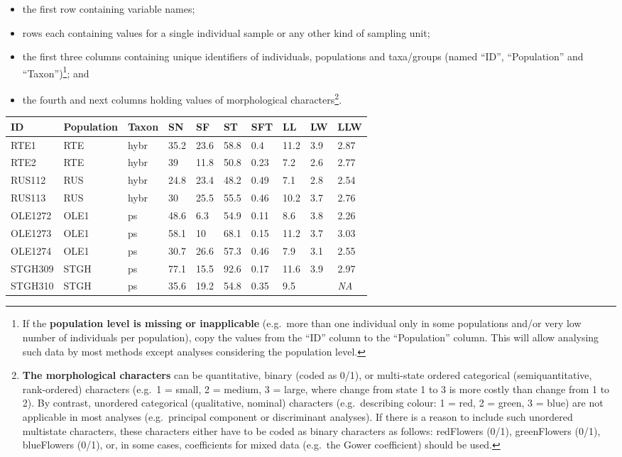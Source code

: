 \documentclass[
]{article}
\providecommand{\tightlist}{%
  \setlength{\itemsep}{0pt}\setlength{\parskip}{0pt}}
\begin{document}
\begin{itemize}
\tightlist
\item
  the first row containing variable names;
\item
  rows each containing values for a single individual sample or any
  other kind of sampling unit;
\item
  the first three columns containing unique identifiers of individuals,
  populations and taxa/groups (named ``ID'', ``Population'' and
  ``Taxon'')\footnote{If the \textbf{population level is missing or
    inapplicable} (e.g.~more than one individual only in some
    populations and/or very low number of individuals per population),
    copy the values from the ``ID'' column to the ``Population'' column.
    This will allow analysing such data by most methods except analyses
    considering the population level.}; and
\item
  the fourth and next columns holding values of morphological
  characters\footnote{\textbf{The morphological characters} can be
    quantitative, binary (coded as 0/1), or multi-state ordered
    categorical (semiquantitative, rank-ordered) characters (e.g.~1 =
    small, 2 = medium, 3 = large, where change from state 1 to 3 is more
    costly than change from 1 to 2). By contrast, unordered categorical
    (qualitative, nominal) characters (e.g.~describing colour: 1 = red,
    2 = green, 3 = blue) are not applicable in most analyses
    (e.g.~principal component or discriminant analyses). If there is a
    reason to include such unordered multistate characters, these
    characters either have to be coded as binary characters as follows:
    redFlowers (0/1), greenFlowers (0/1), blueFlowers (0/1), or, in some
    cases, coefficients for mixed data (e.g.~the Gower coefficient)
    should be used.}.
\end{itemize}

\begin{longtable}[]{@{}llllllllll@{}}
\toprule
ID & Population & Taxon & SN & SF & ST & SFT & LL & LW &
LLW\tabularnewline
\midrule
\endhead
RTE1 & RTE & hybr & 35.2 & 23.6 & 58.8 & 0.4 & 11.2 & 3.9 &
2.87\tabularnewline
RTE2 & RTE & hybr & 39 & 11.8 & 50.8 & 0.23 & 7.2 & 2.6 &
2.77\tabularnewline
RUS112 & RUS & hybr & 24.8 & 23.4 & 48.2 & 0.49 & 7.1 & 2.8 &
2.54\tabularnewline
RUS113 & RUS & hybr & 30 & 25.5 & 55.5 & 0.46 & 10.2 & 3.7 &
2.76\tabularnewline
OLE1272 & OLE1 & ps & 48.6 & 6.3 & 54.9 & 0.11 & 8.6 & 3.8 &
2.26\tabularnewline
OLE1273 & OLE1 & ps & 58.1 & 10 & 68.1 & 0.15 & 11.2 & 3.7 &
3.03\tabularnewline
OLE1274 & OLE1 & ps & 30.7 & 26.6 & 57.3 & 0.46 & 7.9 & 3.1 &
2.55\tabularnewline
STGH309 & STGH & ps & 77.1 & 15.5 & 92.6 & 0.17 & 11.6 & 3.9 &
2.97\tabularnewline
STGH310 & STGH & ps & 35.6 & 19.2 & 54.8 & 0.35 & 9.5 & &
\emph{NA}\tabularnewline
\bottomrule
\end{longtable}
\end{document}
